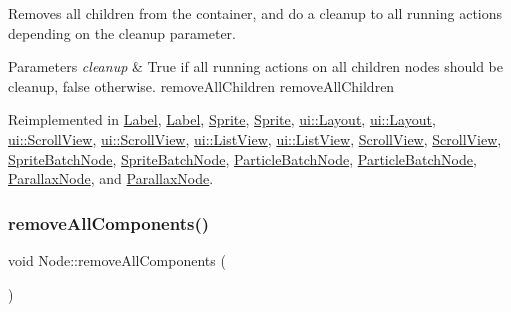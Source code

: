 Removes all children from the container, and do a cleanup to all running actions depending on the cleanup parameter.


\begin{DoxyParams}{Parameters}
{\em cleanup} & True if all running actions on all children nodes should be cleanup, false otherwise.  remove\+All\+Children  remove\+All\+Children \\
\hline
\end{DoxyParams}


Reimplemented in \hyperlink{classLabel_a5ea31447a69e1a0974aee74ad9a072e2}{Label}, \hyperlink{classLabel_a085855ab76a711d7314ae6ae6ce44c47}{Label}, \hyperlink{classSprite_aaaf5e178d5fd88574b9803fe3fab94fa}{Sprite}, \hyperlink{classSprite_a10eb2d2ae7c326487850cd1fec42382c}{Sprite}, \hyperlink{classui_1_1Layout_a7dcfdbe18bfc9e55169e957597aa19ca}{ui\+::\+Layout}, \hyperlink{classui_1_1Layout_a7c317fa2fc294158776962b9218304b9}{ui\+::\+Layout}, \hyperlink{classui_1_1ScrollView_ab72a5f9a41f99b6b8c41596bacdd116f}{ui\+::\+Scroll\+View}, \hyperlink{classui_1_1ScrollView_ac71d0fe89be6291abbccf6a6f8f011b4}{ui\+::\+Scroll\+View}, \hyperlink{classui_1_1ListView_a04bcc9bd8c55dea8f034a8380b3ab3a8}{ui\+::\+List\+View}, \hyperlink{classui_1_1ListView_a01691c095058bc86f372e6439b15b151}{ui\+::\+List\+View}, \hyperlink{classScrollView_a8b2cfd556bae69ffbd5ae3d5813d53e5}{Scroll\+View}, \hyperlink{classScrollView_ac71d0fe89be6291abbccf6a6f8f011b4}{Scroll\+View}, \hyperlink{classSpriteBatchNode_aef759fbb4337b71813e05bf91a0daae8}{Sprite\+Batch\+Node}, \hyperlink{classSpriteBatchNode_a1b49c2764f43641c912c66c2d58b85a0}{Sprite\+Batch\+Node}, \hyperlink{classParticleBatchNode_ac4875ff56dadd5f836d9b99a36201bb1}{Particle\+Batch\+Node}, \hyperlink{classParticleBatchNode_ac4875ff56dadd5f836d9b99a36201bb1}{Particle\+Batch\+Node}, \hyperlink{classParallaxNode_acff596a0ad508105213baddf02cb05e8}{Parallax\+Node}, and \hyperlink{classParallaxNode_aa3b4fa198c648421759a8500d2e8d97a}{Parallax\+Node}.

\mbox{\label{classNode_a6c5d3cf6a590df570cac7ddbfe85c9d3}} 
\subsubsection{\texorpdfstring{remove\+All\+Components()}{removeAllComponents()}\hspace{0.1cm}{\footnotesize\ttfamily [1/2]}}
{\footnotesize\ttfamily void Node\+::remove\+All\+Components (\begin{DoxyParamCaption}{ }\end{DoxyParamCaption})\hspace{0.3cm}{\ttfamily [virtual]}}

